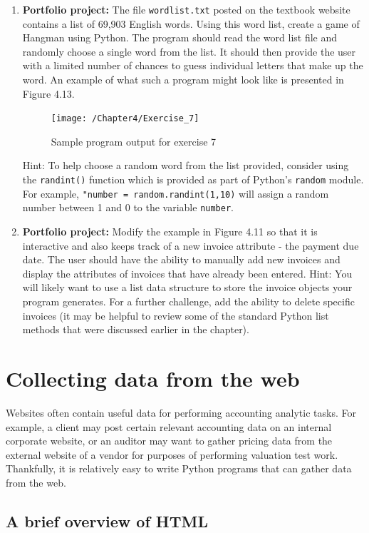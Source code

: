 \documentclass{book}
\begin{document}
\begin{enumerate}
	\item \textbf{Portfolio project:} The file \texttt{wordlist.txt} posted on the textbook website contains a list of 69,903 English words. Using this word list, create a game of Hangman using Python. The program should read the word list file and randomly choose a single word from the list. It should then provide the user with a limited number of chances to guess individual letters that make up the word. An example of what such a program might look like is presented in Figure 4.13.
	
	\begin{figure}[h]
		\caption{Sample program output for exercise 7}
		\centering\texttt{[image: /Chapter4/Exercise\_7]}
	\end{figure}

	Hint: To help choose a random word from the list provided, consider using the \texttt{randint()} function which is provided as part of Python's \texttt{random} module. For example, \texttt{"number = random.randint(1,10)} will assign a random number between 1 and 0 to the variable \texttt{number}.
	
	\item \textbf{Portfolio project:} Modify the example in Figure 4.11 so that it is interactive and also keeps track of a new invoice attribute - the payment due date. The user should have the ability to manually add new invoices and display the attributes of invoices that have already been entered. Hint: You will likely want to use a list data structure to store the invoice objects your program generates. For a further challenge, add the ability to delete specific invoices (it may be helpful to review some of the standard Python list methods that were discussed earlier in the chapter).
\end{enumerate}

\chapter{Collecting data from the web}
	Websites often contain useful data for performing accounting analytic tasks. For example, a client may post certain relevant accounting data on an internal corporate website, or an auditor may want to gather pricing data from the external website of a vendor for purposes of performing valuation test work. Thankfully, it is relatively easy to write Python programs that can gather data from the web.
	
\section{A brief overview of HTML}
	
\end{document}
